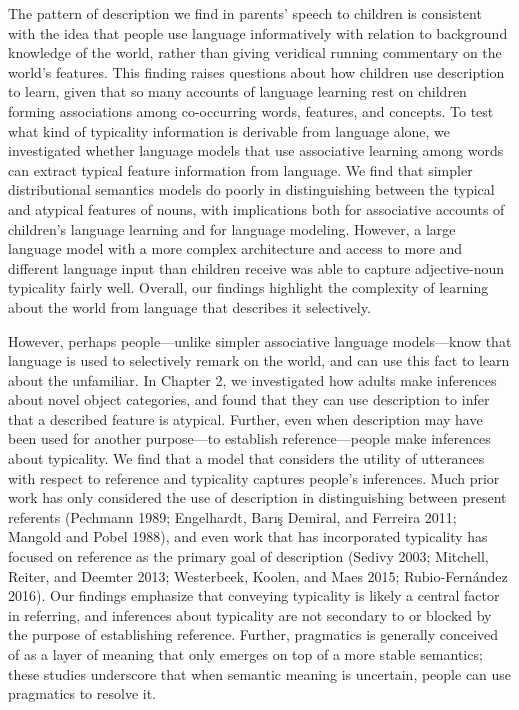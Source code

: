 \documentclass{ucetd}
\begin{document}
The pattern of description we find in parents' speech to children is
consistent with the idea that people use language informatively with
relation to background knowledge of the world, rather than giving
veridical running commentary on the world's features. This finding
raises questions about how children use description to learn, given that
so many accounts of language learning rest on children forming
associations among co-occurring words, features, and concepts. To test
what kind of typicality information is derivable from language alone, we
investigated whether language models that use associative learning among
words can extract typical feature information from language. We find
that simpler distributional semantics models do poorly in distinguishing
between the typical and atypical features of nouns, with implications
both for associative accounts of children's language learning and for
language modeling. However, a large language model with a more complex
architecture and access to more and different language input than
children receive was able to capture adjective-noun typicality fairly
well. Overall, our findings highlight the complexity of learning about
the world from language that describes it selectively.

However, perhaps people---unlike simpler associative language
models---know that language is used to selectively remark on the world,
and can use this fact to learn about the unfamiliar. In Chapter 2, we
investigated how adults make inferences about novel object categories,
and found that they can use description to infer that a described
feature is atypical. Further, even when description may have been used
for another purpose---to establish reference---people make inferences
about typicality. We find that a model that considers the utility of
utterances with respect to reference and typicality captures people's
inferences. Much prior work has only considered the use of description
in distinguishing between present referents (Pechmann 1989; Engelhardt,
Barış Demiral, and Ferreira 2011; Mangold and Pobel 1988), and even work
that has incorporated typicality has focused on reference as the primary
goal of description (Sedivy 2003; Mitchell, Reiter, and Deemter 2013;
Westerbeek, Koolen, and Maes 2015; Rubio-Fernández 2016). Our findings
emphasize that conveying typicality is likely a central factor in
referring, and inferences about typicality are not secondary to or
blocked by the purpose of establishing reference. Further, pragmatics is
generally conceived of as a layer of meaning that only emerges on top of
a more stable semantics; these studies underscore that when semantic
meaning is uncertain, people can use pragmatics to resolve it.
\end{document}
